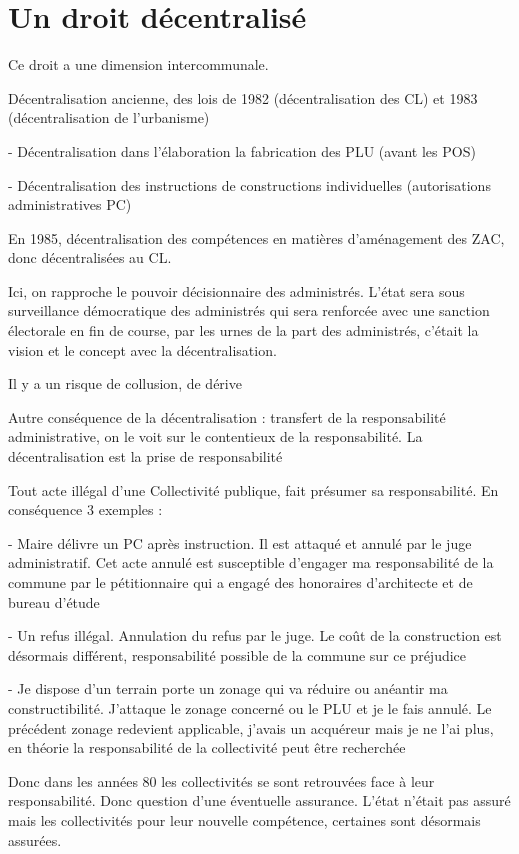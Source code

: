 	\section{Un droit décentralisé}

		Ce droit a une dimension intercommunale.

		Décentralisation ancienne, des lois de 1982 (décentralisation des CL) et 1983 (décentralisation de l’urbanisme)

		-	Décentralisation dans l’élaboration la fabrication des PLU (avant les POS)

		-	Décentralisation des instructions de constructions individuelles (autorisations administratives PC)

		En 1985, décentralisation des compétences en matières d’aménagement des ZAC, donc décentralisées au CL.


		Ici, on rapproche le pouvoir décisionnaire des administrés. L’état sera sous surveillance démocratique des administrés qui sera renforcée avec une sanction électorale en fin de course, par les urnes de la part des administrés, c’était la vision et le concept avec la décentralisation.


		Il y a un risque de collusion, de dérive


		Autre conséquence de la décentralisation : transfert de la responsabilité administrative, on le voit sur le contentieux de la responsabilité. La décentralisation est la prise de responsabilité

		Tout acte illégal d’une Collectivité publique, fait présumer sa responsabilité. En conséquence 3 exemples :

		-	Maire délivre un PC après instruction. Il est attaqué et annulé par le juge administratif. Cet acte annulé est susceptible d’engager ma responsabilité de la commune par le pétitionnaire qui a engagé des honoraires d’architecte et de bureau d’étude

		-	Un refus illégal. Annulation du refus par le juge. Le coût de la construction est désormais différent, responsabilité possible de la commune sur ce préjudice

		-	Je dispose d’un terrain porte un zonage qui va réduire ou anéantir ma constructibilité. J’attaque le zonage concerné ou le PLU et je le fais annulé. Le précédent zonage redevient applicable, j’avais un acquéreur mais je ne l’ai plus, en théorie la responsabilité de la collectivité peut être recherchée


		Donc dans les années 80 les collectivités se sont retrouvées face à leur responsabilité. Donc question d’une éventuelle assurance. L’état n’était pas assuré mais les collectivités pour leur nouvelle compétence, certaines sont désormais assurées.

